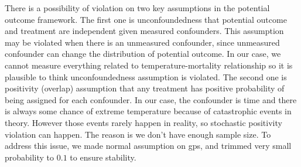\documentclass[12pt]{article}
\begin{document}
There is a possibility of violation on two key assumptions in the potential outcome framework.
The first one is unconfoundedness
that potential outcome and treatment are independent given measured confounders.
This assumption may be violated when there is an unmeasured confounder,
since unmeasured confounder can change the distribution of potential outcome.
In our case, we cannot measure everything related to temperature-mortality relationship
so it is plausible to think unconfoundedness assumption is violated.
The second one is positivity (overlap) assumption
that any treatment has positive probability of being assigned for each confounder.
In our case, the confounder is time and 
there is always some chance of extreme temperature because of catastrophic events in theory.
However those events rarely happen in reality, 
so stochastic positivity violation\cite{zivich2022} can happen.
The reason is we don't have enough sample size.
To address this issue, we made normal assumption on gps,
and trimmed very small probability to $0.1$ to ensure stability.


{}

\end{document}
